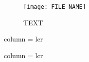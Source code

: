 \documentclass[journal abbreviation]{copernicus}
\begin{document}

\begin{figure*}[t]
\vspace*{2mm}
\begin{center}
\texttt{[image: FILE NAME]}
\end{center}
\caption{TEXT}
\end{figure*}





\begin{table}[t]
\caption{TEXT}
\vskip4mm
\centering
\begin{tabular}{column = lcr}
\tophline

\middlehline

\bottomhline
\end{tabular}
\end{table}



\begin{table*}[t]
\caption{TEXT}
\vskip4mm
\centering
\begin{tabular}{column = lcr}
\tophline

\middlehline

\bottomhline
\end{tabular}
\end{table*}






\addtocounter{figure}{-1}\renewcommand{\thefigure}{\arabic{figure}a}
\end{document}

